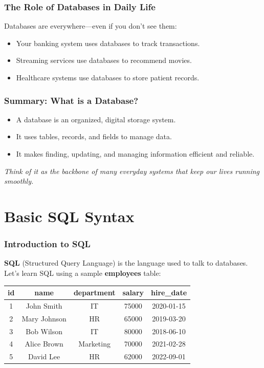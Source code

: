 \documentclass[10pt]{beamer}
\begin{document}
\begin{frame}[fragile]
  \frametitle{The Role of Databases in Daily Life}
  Databases are everywhere—even if you don't see them:
  \begin{itemize}
    \item Your banking system uses databases to track transactions.
    \item Streaming services use databases to recommend movies.
    \item Healthcare systems use databases to store patient records.
  \end{itemize}
\end{frame}

\begin{frame}[fragile]
  \frametitle{Summary: What is a Database?}
  \begin{itemize}
    \item A database is an organized, digital storage system.
    \item It uses tables, records, and fields to manage data.
    \item It makes finding, updating, and managing information efficient and reliable.
  \end{itemize}
  \textit{Think of it as the backbone of many everyday systems that keep our lives running smoothly.}
\end{frame}


\section{Basic SQL Syntax}

\begin{frame}[fragile]
  \frametitle{Introduction to SQL}
  \textbf{SQL} (Structured Query Language) is the language used to talk to databases. \\
  \vspace{0.5em}
  Let's learn SQL using a sample \textbf{employees} table:
  \begin{center}
    \begin{tabular}{|c|c|c|c|c|}
      \hline
      \textbf{id} & \textbf{name} & \textbf{department} & \textbf{salary} & \textbf{hire\_date} \\
      \hline
      1 & John Smith & IT & 75000 & 2020-01-15 \\
      2 & Mary Johnson & HR & 65000 & 2019-03-20 \\
      3 & Bob Wilson & IT & 80000 & 2018-06-10 \\
      4 & Alice Brown & Marketing & 70000 & 2021-02-28 \\
      5 & David Lee & HR & 62000 & 2022-09-01 \\
      \hline
    \end{tabular}
  \end{center}
\end{frame}
\end{document}
